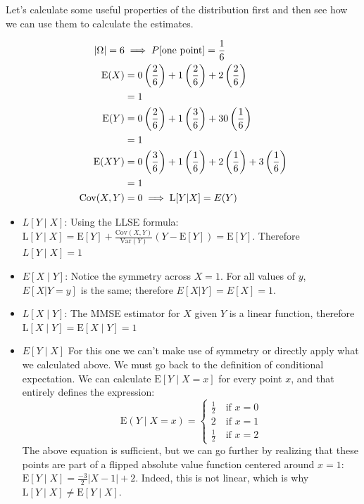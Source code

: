 \begin{solution}
Let's calculate some useful properties of the distribution first and 
then see how we can use them to calculate the estimates.

\begin{align*}
    |\Omega| = 6 &\implies P[\text{one point}] = \frac{1}{6} \\
    \text{E}(X) &= 0\left(\frac{2}{6}\right) + 1\left(\frac{2}{6}\right) + 
    2\left(\frac{2}{6}\right) \\
    &= 1\\
    \text{E}(Y) &= 0\left(\frac{2}{6}\right) + 1\left(\frac{3}{6}\right) + 
    30\left(\frac{1}{6}\right) \\
    &= 1\\
    \text{E}(XY) &= 0\left(\frac{3}{6}\right) + 1\left(\frac{1}{6}\right) + 
    2\left(\frac{1}{6}\right) + 3\left(\frac{1}{6}\right) \\
    &= 1\\
\text{Cov}(X,Y) &= 0 \implies \mathrm{L}[Y|X] = E(Y)
\end{align*}

\begin{itemize}
\item $L[Y\mid X]$: Using the LLSE formula: $\mathrm{L}[Y \mid X] = 
\mathrm{E}[Y] + \frac{\mathrm{Cov}(X,Y)}{\mathrm{Var}(Y)} 
(Y-\mathrm{E}[Y]) = \mathrm{E}[Y]$. Therefore $\boxed{L[Y\mid X] = 1}$

\item $E[X\mid Y]$: Notice the symmetry across $X=1$. For all 
values of $y$, $E[X|Y=y]$ is the same; therefore $\boxed{E[X|Y] = 
E[X] = 1}$. 

\item $L[X\mid Y]$: The MMSE estimator for $X$ given $Y$ is a 
linear function, therefore $\boxed{\mathrm{L}[X\mid Y] = 
\mathrm{E}[X\mid Y] = 1}$

\item $E[Y\mid X]$ For this one we can't make use of symmetry or 
directly apply what we calculated above. We must go back to the 
definition of conditional expectation. We can calculate 
$\mathrm{E}[Y\mid X=x]$ for every point $x$, and that entirely 
defines the expression:
\begin{equation*}
    \mathrm{E}(Y\mid X=x) = 
    \begin{cases}
    \frac{1}{2} \quad\text{if $x = 0$} \\
    2 \quad\text{if $x = 1$} \\
    \frac{1}{2} \quad\text{if $x = 2$}
    \end{cases}
\end{equation*}
The above equation is sufficient, but we can go further by 
realizing that these points are part of a flipped absolute value 
function centered around $x=1$: $\boxed{\mathrm{E}[Y\mid X] = 
\frac{-3}{2} |X-1| + 2}$. Indeed, this is not linear, which is 
why $\mathrm{L}[Y\mid X] \neq \mathrm{E}[Y\mid X]$. 
\end{itemize}
 

 
\end{solution}